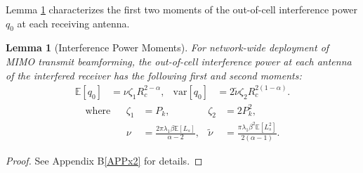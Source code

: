 \documentclass[12pt, draftclsnofoot, onecolumn]{IEEEtran}
\newtheorem{MomentsLemma}{Lemma}
\theoremstyle{plain}
\begin{document}
%
Lemma \ref{Theorem2} characterizes the first two moments of the out-of-cell interference power $\mathit{q}_{0}$ at each receiving antenna. %
\vspace{-.09in}
\begin{MomentsLemma}[Interference Power Moments]\label{Theorem2}
For network-wide deployment of MIMO transmit beamforming, the out-of-cell interference power at each antenna of the interfered receiver has the following first and second moments:
\begin{align}
\mathbb{E}\left[\mathit{q}_{0}\right]&= 
         {\nu}{ \zeta_1 }{}  {R_c^{2-\alpha}}, &
\text{var}\left[\mathit{q}_{0}\right]&= 
2 \tilde{\nu}{\zeta_2}{}  {R_c^{2(1-\alpha)}}.\label{var2}
\end{align}
\begin{align}
\!\!\!\!\!\!\!\!\!\!\!\!\!\!\!\!\!\!\!\!\!\!\!\!\!\!\text{where} &&\!\!\!\!\!\!\!\!\!\! \zeta_1&= P_{k}, & \zeta_2&= 2 P_{k}^2,\nonumber\\
\!\!\!\!\!\!\!\!\!\!\!\!\!\!\!\!\!\!\!\!\!\!\!\!\!\!&&\!\!\!\!\!\!\!\!\!\!{\nu}&=\frac{2\pi \lambda_1 \beta  \mathbb{E}[\mathit{L}_{s}]}{\alpha -2}, & \tilde{\nu}&=\frac{\pi \lambda_1 \beta^2 \mathbb{E}[\mathit{L}_{s}^2]}{2(\alpha -1)}.
\end{align}
\end{MomentsLemma}
\begin{proof}
See Appendix B\ref{APPx2} for details.
\end{proof}
\end{document}
